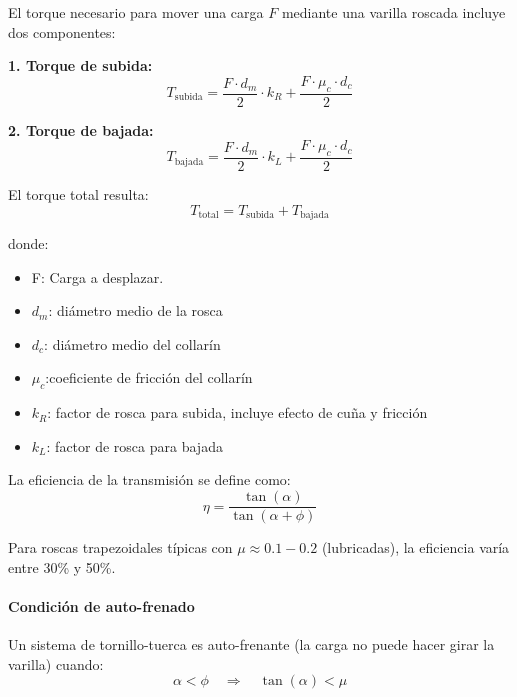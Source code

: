 El torque necesario para mover una carga $F$ mediante una varilla roscada incluye dos componentes:

\textbf{1. Torque de subida:}
\begin{equation}
T_{\text{subida}} = \frac{F \cdot d_m}{2} \cdot k_R + \frac{F \cdot \mu_c \cdot d_c}{2}
\label{eq:torque_subida}
\end{equation}

\textbf{2. Torque de bajada:}
\begin{equation}
T_{\text{bajada}} = \frac{F \cdot d_m}{2} \cdot k_L + \frac{F \cdot \mu_c \cdot d_c}{2}
\label{eq:torque_bajada}
\end{equation}

El torque total resulta:
\begin{equation}
    T_{\text{total}} = T_{\text{subida}} + T_{\text{bajada}} 
    \label{eq:torque_total_varilla}
\end{equation}

donde:
\begin{itemize}
    \item F: Carga a desplazar.
    \item $d_m$: diámetro medio de la rosca
    \item $d_c$: diámetro medio del collarín
    \item $\mu_c$:coeficiente de fricción del collarín
    \item $k_R$:  factor de rosca para subida, incluye efecto de cuña y fricción
    \item $k_L$: factor de rosca para bajada
\end{itemize}

La eficiencia de la transmisión se define como:
\begin{equation}
    \eta = \frac{\tan(\alpha)}{\tan(\alpha + \phi)}
\end{equation}

Para roscas trapezoidales típicas con $\mu \approx 0.1-0.2$ (lubricadas), la eficiencia varía entre 30\% y 50\%.

\paragraph{Condición de auto-frenado}
Un sistema de tornillo-tuerca es auto-frenante (la carga no puede hacer girar la varilla) cuando:
\begin{equation}
    \alpha < \phi \quad \Rightarrow \quad \tan(\alpha) < \mu
\end{equation}

